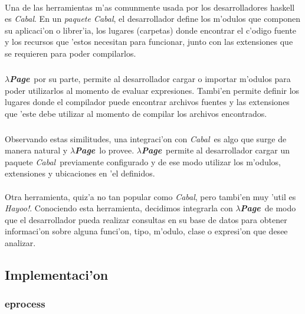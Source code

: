 \documentclass[a4paper]{article}
\newcommand{\hpage}{\textbf{\textsl{$\lambda$Page}}}
\newcommand{\cabal}{\textsl{Cabal}}
\begin{document}
\paragraph{}Una de las herramientas m'as comunmente usada por los desarrolladores haskell es \cabal.  En un \textsl{paquete Cabal}, el desarrollador define los m'odulos que componen su aplicaci'on o librer'ia, los lugares (carpetas) donde encontrar el c'odigo fuente y los recursos que 'estos necesitan para funcionar, junto con las extensiones que se requieren para poder compilarlos.
\subparagraph{}\hpage\ por su parte, permite al desarrollador cargar o importar m'odulos para poder utilizarlos al momento de evaluar expresiones.  Tambi'en permite definir los lugares donde el compilador puede encontrar archivos fuentes y las extensiones que 'este debe utilizar al momento de compilar los archivos encontrados.
\subparagraph{}Observando estas similitudes, una integraci'on con \cabal\ es algo que surge de manera natural y \hpage\ lo provee.  \hpage\ permite al desarrollador cargar un paquete \cabal\ previamente configurado y de ese modo utilizar los m'odulos, extensiones y ubicaciones en 'el definidos.
\paragraph{}Otra herramienta, quiz'a no tan popular como \cabal, pero tambi'en muy 'util es \textsl{Hayoo!}.  Conociendo esta herramienta, decidimos integrarla con \hpage\ de modo que el desarrollador pueda realizar consultas en su base de datos para obtener informaci'on sobre alguna funci'on, tipo, m'odulo, clase o expresi'on que desee analizar.

\subsection{Implementaci'on}\label{secImplement}
\begin{epigraphs}
\end{epigraphs}

\subsubsection{eprocess}
\end{document}
